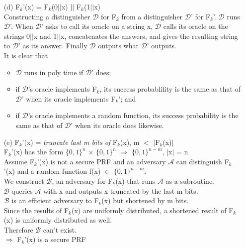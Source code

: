\begin{itemize}
\item[(d)]
	F\(_{k}\)'(x) =  F\(_{k}\)(0\(\vert \vert\)x) \(\vert \vert\) F\(_{k}\)(1\(\vert \vert\)x) \\
	Constructing a distinguisher \(\mathcal{D}\) for F\(_{k}\) from a distinguisher \(\mathcal{D}\)' for F\(_{k}\)'. \(\mathcal{D}\) runs \(\mathcal{D}\)'. 
	When \(\mathcal{D}\)' asks to call its oracle on a string x, \(\mathcal{D}\) calls its oracle on the strings 0\(\vert \vert\)x and 1\(\vert \vert\)x, concatenates
	the answers, and gives the resulting string to \(\mathcal{D}\)' as its answer. Finally \(\mathcal{D}\) outputs what  \(\mathcal{D}\)' outputs. \\
	It is clear that
	\begin{itemize}
		\item \(\mathcal{D}\) runs in poly time if \(\mathcal{D}\)' does;
		\item if \(\mathcal{D}\)'s oracle implements F\(_{k}\), its success probablility is the same as that of  \(\mathcal{D}\)' when its oracle implements F\(_{k}\)'; and
		\item if  \(\mathcal{D}\)'s oracle implements a random function, its success probability is the same as that of  \(\mathcal{D}\)' when its oracle does likewise.
	\end{itemize}
\item[(e)]
	F\(_{k}\)'(x)  = \textit{truncate last m bits of}  F\(_{k}\)(x), m \(<\) \(\vert\)F\(_{k}\)(x)\(\vert\) \\
	F\(_{k}\)'(x) has the form \(\{0,1\}^{n}\) \(\times\) \(\{0,1\}^{n}\) \(\Rightarrow\) \(\{0,1\}^{n-m}\), \(\vert\)x\(\vert\) = n \\
	Assume F\(_{k}\)'(x) is not a secure PRF and an adversary \(\mathcal{A}\) can distinguish F\(_{k}\)'(x) and a random function f(x) \(\in\) \(\{0,1\}^{n-m}\). \\
	We construct \(\mathcal{B}\), an adversary for F\(_{k}\)(x) that runs \(\mathcal{A}\) as a subroutine.\\
	\(\mathcal{B}\) queries \(\mathcal{A}\) with x and outputs x truncated by the last m bits. \\
	\(\mathcal{B}\) is an efficient adversary to F\(_{k}\)(x) but shortened by m bits.\\
	Since the results of F\(_{k}\)(x) are uniformly distributed, a shortened result of F\(_{k}\)(x) is uniformly distributed as well. \\
	Therefore \(\mathcal{B}\) can't exist. \\
	\(\Rightarrow\) F\(_{k}\)'(x) is a secure PRF \\
\end{itemize}